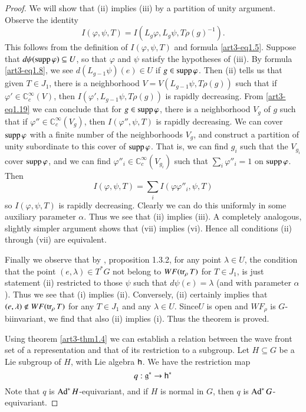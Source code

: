 \begin{proof}
We will show that (ii) implies (iii) by a partition of unity argument. Observe the identity
\begin{equation*}
I(\varphi,\psi,T)=I(L_{g}\varphi,L_{g}\psi,T\rho(g)^{-1}).\tag{1.19}\label{art3-eq1.19}
\end{equation*}
This follows from the definition of $I(\varphi,\psi,T)$ and formula \eqref{art3-eq1.5}. Suppose that $d\psi(\operatorname{supp} \varphi)\subseteq U$, so that $\varphi$ and $\psi$ satisfy the hypotheses of (iii). By formula \eqref{art3-eq1.8}, we see $d(L_{g-1}\psi)(e)\in U$ if $g\in \operatorname{supp} \varphi$. Then (ii) tells us that given $T\in J_{1}$, there is a neighborhood $V=V(L_{g-1}\psi,T\rho(g))$ such that if $\varphi'\in \mathbb{C}^{\infty}_{c}(V)$, then $I(\varphi',L_{g-1}\psi,T\rho(g))$ is rapidly decreasing. From \eqref{art3-eq1.19} we can conclude that for $g\in \operatorname{supp} \varphi$, there is a neighborhood $V_{g}$ of $g$ such that if $\varphi''\in \mathbb{C}^{\infty}_{c}(V_{g})$, then $I(\varphi'',\psi,T)$ is rapidly decreasing. We can cover $\operatorname{supp} \varphi$ with a finite number of the neighborhoods $V_{g}$, and construct a partition of unity subordinate to this cover of $\operatorname{supp} \varphi$. That is, we can find $g_{i}$ such that the $V_{g_{i}}$ cover $\operatorname{supp} \varphi$, and we can find $\varphi''_{i}\in \mathbb{C}^{\infty}_{c}(V_{g_{i}})$ such that $\sum\limits_{i}\varphi''_{i}=1$ on $\operatorname{supp} \varphi$. Then
$$
I(\varphi,\psi,T)=\sum\limits_{i}I(\varphi\varphi''_{i},\psi,T)
$$
so $I(\varphi,\psi,T)$ is rapidly decreasing. Clearly we can do this uniformly in some auxiliary parameter $\alpha$. Thus we see that (ii) implies (iii). A completely analogous, slightly simpler argument shows that (vii) implies (vi). Hence all conditions (ii) through (vii) are equivalent.

Finally we observe that by \cite{art3-D}, proposition 1.3.2, for any point $\lambda\in U$, the condition that the point $(e,\lambda)\in T^{*}G$ not belong to $WF(\operatorname{tr}_{\rho}T)$ for $T\in J_{1}$, is just statement (ii) restricted to those $\psi$ such that $d\psi(e)=\lambda$ (and with parameter $\alpha$). Thus we see that (i) implies (ii). Conversely, (ii) certainly implies that $(e,\lambda)\not\in WF(\operatorname{tr}_{\rho}T)$ for any $T\in J_{1}$ and any $\lambda\in U$. Since\pageoriginale $U$ is open and $WF_{\rho}$ is $G$-biinvariant, we find that also (ii) implies (i). Thus the theorem is proved.

Using theorem \ref{art3-thm1.4} we can establish a relation between the wave front set of a representation and that of its restriction to a subgroup. Let $H\subseteq G$ be a Lie subgroup of $H$, with Lie algebra $\mathsf{h}$. We have the restriction map
$$
q:\mathfrak{g}^{*}\to \mathsf{h}^{*}
$$
Note that $q$ is $\operatorname{Ad}^{*}H$-equivariant, and if $H$ is normal in $G$, then $q$ is $\operatorname{Ad}^{*}G$-equivariant.
\end{proof}

